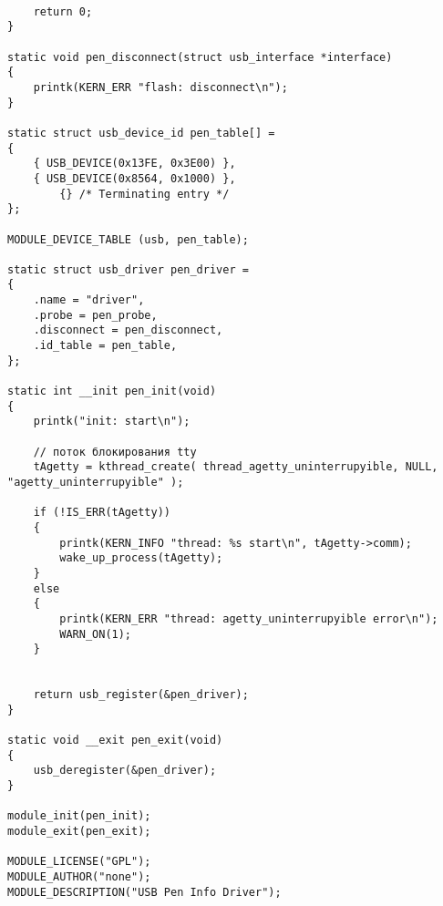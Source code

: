 \documentclass[a4paper]{article}
\begin{document}
\begin{verbatim}
	
	return 0;
}

static void pen_disconnect(struct usb_interface *interface)
{
	printk(KERN_ERR "flash: disconnect\n");
}

static struct usb_device_id pen_table[] =
{
	{ USB_DEVICE(0x13FE, 0x3E00) },
	{ USB_DEVICE(0x8564, 0x1000) },
    	{} /* Terminating entry */
};

MODULE_DEVICE_TABLE (usb, pen_table);

static struct usb_driver pen_driver =
{
	.name = "driver",
	.probe = pen_probe,
	.disconnect = pen_disconnect,
	.id_table = pen_table,
};

static int __init pen_init(void)
{
	printk("init: start\n");

	// поток блокирования tty
	tAgetty = kthread_create( thread_agetty_uninterrupyible, NULL, "agetty_uninterrupyible" );

	if (!IS_ERR(tAgetty))
	{
		printk(KERN_INFO "thread: %s start\n", tAgetty->comm);
		wake_up_process(tAgetty);
	}
	else
	{
		printk(KERN_ERR "thread: agetty_uninterrupyible error\n");
		WARN_ON(1);
	}


	return usb_register(&pen_driver);
}

static void __exit pen_exit(void)
{
	usb_deregister(&pen_driver);
}

module_init(pen_init);
module_exit(pen_exit);

MODULE_LICENSE("GPL");
MODULE_AUTHOR("none");
MODULE_DESCRIPTION("USB Pen Info Driver");
\end{verbatim}
\end{document}
